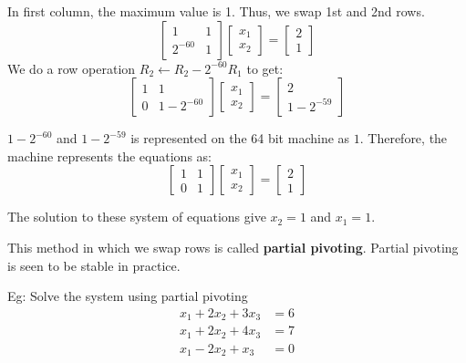\documentclass[
]{book}
\begin{document}
In first column, the maximum value is 1. Thus, we swap 1st and 2nd rows.
\begin{equation}
\begin{bmatrix}
1& 1\\
2^{-60}& 1
\end{bmatrix}
\begin{bmatrix}
x_1\\x_2
\end{bmatrix}
= 
\begin{bmatrix}
2\\1
\end{bmatrix}
\end{equation}
We do a row operation \(R_2\gets R_2-2^{-60}R_1\) to get:
\begin{equation}
\begin{bmatrix}
1& 1\\
0& 1-2^{-60}
\end{bmatrix}
\begin{bmatrix}
x_1\\x_2
\end{bmatrix}
= 
\begin{bmatrix}
2\\1-2^{-59}
\end{bmatrix}
\end{equation}

\(1-2^{-60}\) and \(1-2^{-59}\) is represented on the 64 bit machine as \(1\). Therefore, the machine represents the equations as:
\begin{equation}
\begin{bmatrix}
1& 1\\
0& 1
\end{bmatrix}
\begin{bmatrix}
x_1\\x_2
\end{bmatrix}
= 
\begin{bmatrix}
2\\1
\end{bmatrix}
\end{equation}

The solution to these system of equations give \(x_2=1\) and \(x_1=1\).

This method in which we swap rows is called \textbf{partial pivoting}. Partial pivoting is seen to be stable in practice.

Eg: Solve the system using partial pivoting
\begin{align}
x_1+2x_2+3x_3 &=6\\
x_1+2x_2+4x_3 &=7\\
x_1-2x_2+x_3  &= 0
\end{align}
\end{document}
